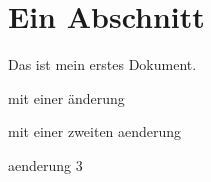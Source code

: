 \documentclass{scrartcl}
\begin{document}
\section{Ein Abschnitt}
Das ist mein erstes Dokument.

mit einer änderung

mit einer zweiten aenderung

aenderung 3
\end{document}
